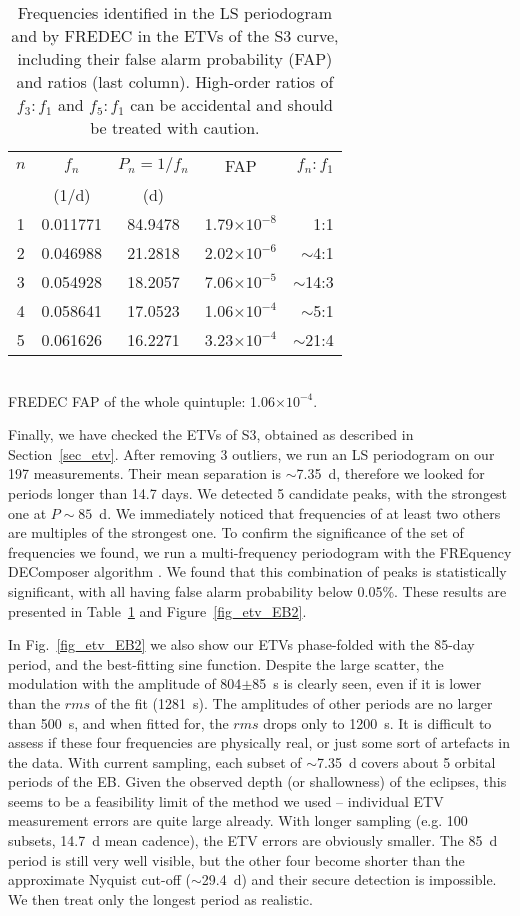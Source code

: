 \documentclass{aa}
\begin{document}
\begin{table}
\centering
\caption{Frequencies identified in the LS periodogram and by FREDEC in the 
ETVs of the S3 curve, including their false alarm probability (FAP) and ratios 
(last column). High-order ratios of $f_3:f_1$ and $f_5:f_1$ can be accidental 
and should be treated with caution.}\label{etv_fred}
\begin{tabular}{ccccr}
\hline \hline
$n$	& $f_n$	& $P_n = 1/f_n$	& FAP	& $f_n : f_1$ \\
	& (1/d)	&	(d)	&	&	\\
\hline
1	& 0.011771 & 84.9478 & 1.79$\times10^{-8}$ & 1:1 \\
2	& 0.046988 & 21.2818 & 2.02$\times10^{-6}$ &$\sim$4:1 \\
3	& 0.054928 & 18.2057 & 7.06$\times10^{-5}$ &$\sim$14:3 \\
4	& 0.058641 & 17.0523 & 1.06$\times10^{-4}$ &$\sim$5:1 \\
5	& 0.061626 & 16.2271 & 3.23$\times10^{-4}$ &$\sim$21:4\\
\hline
\end{tabular}
\\FREDEC FAP of the whole quintuple: 1.06$\times10^{-4}$.
\end{table}

Finally, we have checked the ETVs of S3, obtained as described in Section~\ref{sec_etv}.
After removing 3 outliers, we run an LS periodogram on our 197 measurements.
Their mean separation is $\sim$7.35~d, therefore we looked for periods longer than
14.7 days. We detected 5 candidate peaks, with the strongest one at $P\sim85$~d. 
We immediately noticed that frequencies of at least two others 
are multiples of the strongest one. To confirm the significance of the set of 
frequencies we found, we run a multi-frequency periodogram with the FREquency 
DEComposer algorithm \citep[FREDEC;][]{bal13a,bal13b}. We found that this combination 
of peaks is statistically significant, with all having false alarm probability 
below 0.05\%. These results are presented in Table~\ref{etv_fred} and 
Figure~\ref{fig_etv_EB2}.

In Fig.~\ref{fig_etv_EB2} we also show our ETVs phase-folded with the 85-day
period, and the best-fitting sine function. Despite the large scatter, the modulation 
with the amplitude of 804$\pm$85~s is clearly seen, even if it is lower than the $rms$
of the fit (1281~s). The amplitudes of other periods are no larger than 500~s, and when
fitted for, the $rms$ drops only to 1200~s. It is difficult to assess if these four 
frequencies are physically real, or just some sort of artefacts in the data. 
With current sampling, each subset of $\sim$7.35~d covers about 5 orbital periods
of the EB. Given the observed depth (or shallowness) of the eclipses, this seems
to be a feasibility limit of the method we used -- individual ETV measurement errors are
quite large already. With longer sampling (e.g. 100 subsets, 14.7~d mean cadence), the
ETV errors are obviously smaller. The 85~d period is still very well visible, but 
the other four become shorter than the approximate Nyquist cut-off ($\sim$29.4~d) and
their secure detection is impossible. We then treat only the longest period as realistic.
\end{document}
